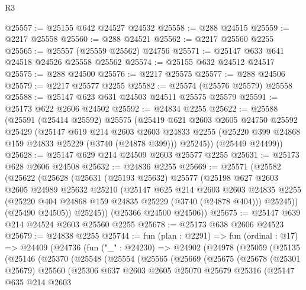 \begin{lexlean}{R3}
\begin{coremodule}
@25557 := @25155 @642 @24527 @24532
@25558 := @288 @24515
@25559 := @2217 @25558
@25560 := @288 @24521
@25562 := @2217 @25560 @2255
@25565 := @25557 (@25559 @25562) @24756
@25571 := @25147 @633 @641 @24518 @24526 @25558 @25562
@25574 := @25155 @632 @24512 @24517
@25575 := @288 @24500
@25576 := @2217 @25575
@25577 := @288 @24506
@25579 := @2217 @25577 @2255
@25582 := @25574 (@25576 @25579) @25558
@25588 := @25147 @623 @631 @24503 @24511 @25575 @25579
@25591 := @25173 @622 @2606 @24502
@25592 := @24834 @2255
@25622 := @25588
    (@25591
      (@25414 @25592)
      @25575
      (@25419
        @621
        @2603
        @2605
        @24750
        @25592
        @25429
        (@25147
          @619
          @214
          @2603
          @2603
          @24833
          @2255
          (@25220 @399 @24868 @159 @24833 @25229 (@3740 (@24878 @399)))
          @25245))
      (@25449 @24499))
@25628 := @25147 @629 @214 @24509 @2603 @25577 @2255
@25631 := @25173 @628 @2606 @24508
@25632 := @24836 @2255
@25669 := @25571
    (@25582
      (@25622
        (@25628
          (@25631
            (@25193 @25632)
            @25577
            (@25198
              @627
              @2603
              @2605
              @24989
              @25632
              @25210
              (@25147
                @625
                @214
                @2603
                @2603
                @24835
                @2255
                (@25220 @404 @24868 @159 @24835 @25229 (@3740 (@24878 @404)))
                @25245))
            (@25490 @24505))
          @25245))
      (@25366 @24500 @24506))
@25675 := @25147 @639 @214 @24524 @2603 @25560 @2255
@25678 := @25173 @638 @2606 @24523
@25679 := @24838 @2255
@25744 := fun (plan : @2291) =>
  fun (ordinal : @17) =>
  @24409
    (@24736
      (fun ("_" : @24230) =>
      @24902
        (@24978
          (@25059
            (@25135
              (@25146
                (@25370
                  (@25548
                    (@25554
                      (@25565
                        (@25669
                          (@25675
                            (@25678
                              (@25301 @25679)
                              @25560
                              (@25306
                                @637
                                @2603
                                @2605
                                @25070
                                @25679
                                @25316
                                (@25147
                                  @635
                                  @214
                                  @2603

\end{coremodule}
\end{lexlean}
